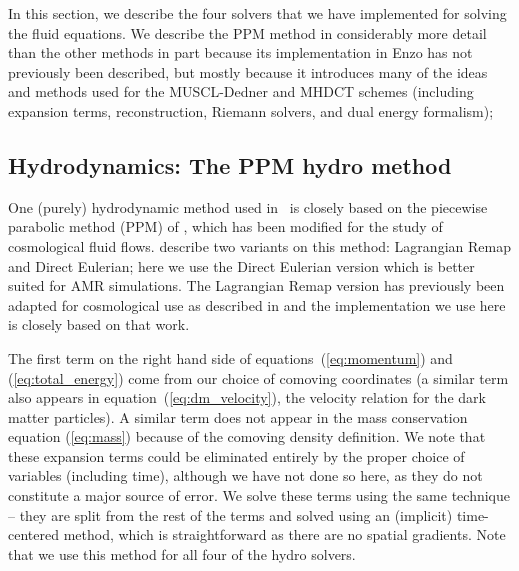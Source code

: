 In this section, we describe the four solvers that we have implemented for
solving the fluid equations.  We describe the PPM method in considerably
more detail than the other methods in part
because its implementation in Enzo has not previously been described,
but mostly because it introduces many of the ideas and methods used for
the MUSCL-Dedner and MHDCT schemes (including expansion terms,
reconstruction, Riemann solvers, and dual energy formalism);

\subsection{Hydrodynamics: The PPM hydro method}
\label{sec.hydro.ppm}

One (purely) hydrodynamic method used in \enzo\ is closely based on the
piecewise parabolic method (PPM) of
\citet{1984JCoPh..54..174C}, which has been
modified for the study of cosmological fluid flows.  
\citet{1984JCoPh..54..174C} describe two variants on this method:
Lagrangian Remap and Direct Eulerian; here we use the Direct Eulerian
version which is better suited for AMR simulations.  The Lagrangian
Remap version has previously been adapted for cosmological use
as described in \citet{1995CoPhC..89..149B} and the implementation
we use here is closely based on that work.

The first term on the right hand side of equations~(\ref{eq:momentum}) and
(\ref{eq:total_energy}) come from our choice of comoving coordinates
(a similar term also appears in equation~(\ref{eq:dm_velocity}), the velocity 
relation for the dark matter particles).  A similar term does not
appear in the mass conservation equation (\ref{eq:mass}) because
of the comoving density definition.   
We note that these expansion terms could be
eliminated entirely by the proper choice of variables (including time),
although we have not done so here, as they do not constitute a major
source of error.  We solve these terms
using the same technique -- they are split from the rest of the terms and
solved using an (implicit) time-centered method, which is straightforward
as there are no spatial gradients.  Note that we use this method for
all four of the hydro solvers.


